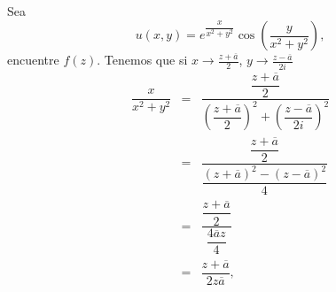 \begin{Ejem}\label{ejem9}
	Sea $$u(x,y)=e^{\dfrac{x}{x^2+y^2}}\cos\left(\dfrac{y}{x^2+y^2}\right),$$  encuentre $f(z)$.
	\solu Tenemos que si $x\rightarrow\frac{z+\overline{a}}{2}$, $y\rightarrow\frac{z-\overline{a}}{2i}$
	\[
		\begin{array}{ccl}
			\dfrac{x}{x^2+y^2}&=&\dfrac{\dfrac{z+\overline{a}}{2}}{\left(\dfrac{z+\overline{a}}{2}\right)^2+\left(\dfrac{z-\overline{a}}{2i}\right)^2}\\
			&=&\dfrac{\dfrac{z+\overline{a}}{2}}{\dfrac{(z+\overline{a})^2-(z-\overline{a})^2}{4}}\\
			&=&\dfrac{\dfrac{z+\overline{a}}{2}}{\dfrac{4\overline{a}z}{4}}\\
			&=&\dfrac{z+\overline{a}}{2z\overline{a}},\\
				\end{array}
			\]
			

\end{Ejem}
